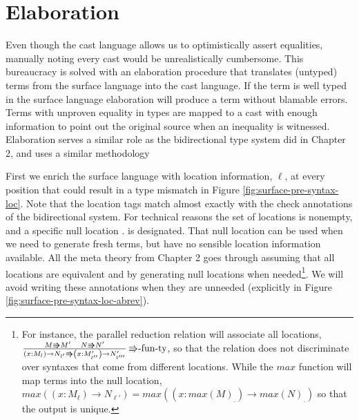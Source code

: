\section{Elaboration}

Even though the cast language allows us to optimistically assert equalities,
manually noting every cast would be unrealistically cumbersome. This
bureaucracy is solved with an elaboration procedure that translates
(untyped) terms from the surface language into the cast language.
If the term is well typed in the surface language elaboration will
produce a term without blamable errors. Terms with unproven equality
in types are mapped to a cast with enough information to point out
the original source when an inequality is witnessed. Elaboration serves
a similar role as the bidirectional type system did in Chapter 2,
and uses a similar methodology

First we enrich the surface language with location information, $\ell$,
at every position that could result in a type mismatch in Figure \ref{fig:surface-pre-syntax-loc}.
Note that the location tags match almost exactly
with the check annotations of the bidirectional system. For technical
reasons the set of locations is nonempty, and a specific null location
$.$ is designated. That null location can
be used when we need to generate fresh terms, but have no sensible
location information available. All the meta theory from Chapter 2
goes through assuming that all locations are equivalent and by generating
null locations when needed\footnote{For instance, the parallel reduction relation will associate all locations,
$\frac{M\Rrightarrow M'\quad N\Rrightarrow N'}{\left(x:M_{l}\right)\rightarrow N_{l'}\Rrightarrow\left(x:M'_{l''}\right)\rightarrow N'_{l'''}}\,\textrm{\ensuremath{\Rrightarrow}-fun-ty}$,
so that the relation does not discriminate over syntaxes that come
from different locations. While the $max$ function will map terms
into the null location, $max\left(\left(x:M_{\ensuremath{\ell}}\right)\rightarrow N_{\ensuremath{\ell'}}\right)=max\left(\left(x:max\left(M\right)_{.}\right)\rightarrow max\left(N\right)_{.}\right)$
so that the output is unique.}. We will avoid writing these annotations when
they are unneeded (explicitly in Figure \ref{fig:surface-pre-syntax-loc-abrev}).

